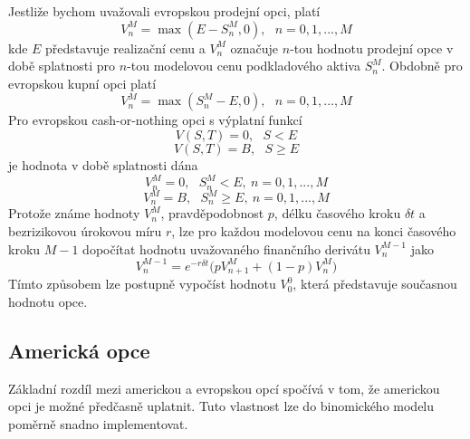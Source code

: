 \documentclass[a4paper]{book}
\begin{document}
Jestliže bychom uvažovali evropskou prodejní opci, platí
\begin{equation*}
V_n^M = \max(E - S_n^M, 0), ~~~ n = 0, 1, ..., M
\end{equation*}
kde $E$ představuje realizační cenu a $V_n^M$ označuje $n$-tou hodnotu prodejní opce v době splatnosti pro $n$-tou modelovou cenu podkladového aktiva $S_n^M$. Obdobně pro evropskou kupní opci platí
\begin{equation*}
V_n^M = \max(S_n^M - E, 0), ~~~ n = 0, 1, ..., M
\end{equation*}
Pro evropskou cash-or-nothing opci s výplatní funkcí
\begin{equation*}
V(S,T) = 0, ~~~ S < E
\end{equation*}
\begin{equation*}
V(S,T) = B, ~~~ S \ge E
\end{equation*}
je hodnota v době splatnosti dána
\begin{equation*}
V_n^M = 0, ~~~ S_n^M < E, ~ n = 0, 1, ..., M
\end{equation*}
\begin{equation*}
V_n^M = B, ~~~ S_n^M \ge E, ~ n = 0, 1, ..., M
\end{equation*}
Protože známe hodnoty $V_n^M$, pravděpodobnost $p$, délku časového kroku $\delta t$ a bezrizikovou úrokovou míru $r$, lze pro každou modelovou cenu na konci časového kroku $M-1$ dopočítat hodnotu uvažovaného finančního derivátu $V_n^{M-1}$ jako
\begin{equation}
V_n^{M-1} = e^{-r \delta t} \Big( pV_{n+1}^M + (1-p)V_n^{M} \Big)
\end{equation}
Tímto způsobem lze postupně vypočíst hodnotu $V_0^0$, která představuje současnou hodnotu opce.

\subsection{Americká opce}

Základní rozdíl mezi americkou a evropskou opcí spočívá v tom, že americkou opci je možné předčasně uplatnit. Tuto vlastnost lze do binomického modelu poměrně snadno implementovat.
\end{document}
